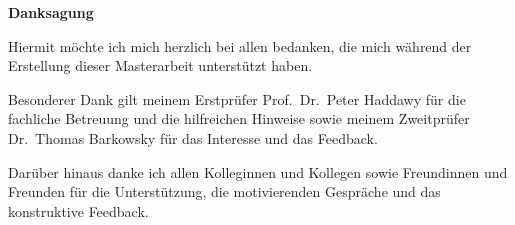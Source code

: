 \clearpage
\thispagestyle{empty}

\begin{center}
{\Large \textbf{Danksagung}}
\end{center}

\vspace{1.5cm}

Hiermit möchte ich mich herzlich bei allen bedanken, die mich während der Erstellung dieser Masterarbeit unterstützt haben.

\vspace{0.6cm}

Besonderer Dank gilt meinem Erstprüfer Prof.\ Dr.\ Peter Haddawy für die fachliche Betreuung und die hilfreichen Hinweise sowie meinem Zweitprüfer Dr.\ Thomas Barkowsky für das Interesse und das Feedback.

\vspace{0.6cm}

Darüber hinaus danke ich allen Kolleginnen und Kollegen sowie Freundinnen und Freunden für die Unterstützung, die motivierenden Gespräche und das konstruktive Feedback.

\vfill

\newpage